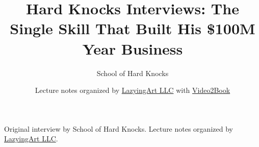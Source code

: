 \documentclass[11pt,oneside]{book}
\begin{document}
\frontmatter
\title{Hard Knocks Interviews: The Single Skill That Built His \$100M Year Business}
\author{School of Hard Knocks}
\date{Lecture notes organized by \href{https://lazying.art}{LazyingArt LLC} with \href{https://github.com/lachlanchen/Video2Book}{Video2Book}}
\maketitle
\begin{center}
\small Original interview by School of Hard Knocks. Lecture notes organized by \href{https://lazying.art}{LazyingArt LLC}.
\end{center}
\clearpage
\mainmatter

\end{document}
